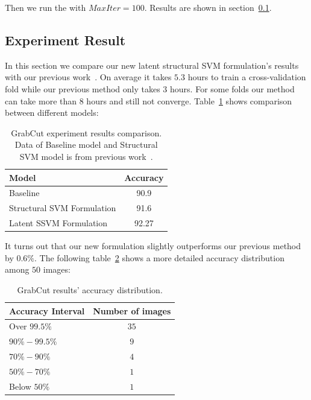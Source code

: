 Then we run the  with $MaxIter=100$. Results
are shown in section~\ref{sec:grabcut_exp_result}. 

\subsection{Experiment Result}
\label{sec:grabcut_exp_result}

In this section we compare our new latent structural SVM
formulation's results with our previous
work~\cite{gouldlearning}. On average it takes $5.3$ hours to
train a cross-validation fold while our previous method only
takes $3$ hours. For some folds our method can take more than $8$
hours and still not converge. Table~\ref{tab:grabCut_acc} shows
comparison between different models:

\begin{table}[h]
  \normalsize
  \centering
  \begin{tabular}{|l|c|}
    \hline
    {\sc Model} & {\sc Accuracy}\\
    \hline
    Baseline & 90.9 \\
    \hline
    Structural SVM Formulation & 91.6 \\
    Latent SSVM Formulation & 92.27 \\
    \hline
  \end{tabular}
  \caption{\label{tab:grabCut_acc} GrabCut experiment results
    comparison. Data of Baseline model and Structural SVM model
    is from previous work~\cite{gouldlearning}.}
\end{table}

It turns out that our new formulation slightly outperforms our
previous method by $0.6\%$. The following
table~\ref{tab:grabCut_hist} shows a more detailed accuracy
distribution among $50$ images:

\begin{table}[h]
  \normalsize
  \centering
  \begin{tabular}{|l|c|}
    \hline
    {\sc Accuracy Interval} & {\sc Number of images}\\
    \hline
    Over $99.5\%$ & $35$ \\
    \hline
    $90\%-99.5\%$ & $9$ \\
    \hline
    $70\%-90\%$ & $4$ \\
    \hline
    $50\%-70\%$ & $1$ \\
    \hline
    Below $50\%$ & $1$ \\
    \hline
  \end{tabular}
  \caption{\label{tab:grabCut_hist} GrabCut results' accuracy
    distribution.}
\end{table}

